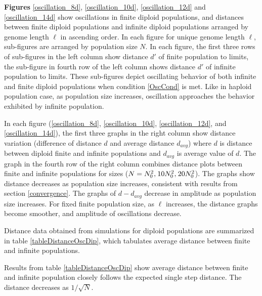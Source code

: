 \textbf{ Figures} \ref{oscillation_8d}, \ref{oscillation_10d}, \ref{oscillation_12d} 
and \ref{oscillation_14d} show oscillations in finite diploid populations, and distances 
between finite diploid populations and infinite diploid populations arranged by genome length $\ell$ in ascending order. 
In each figure for unique genome length $\ell$, sub-figures 
are arranged by population size $N$. In each figure, the first three rows of sub-figures in the left column show distance $d'$ of finite population 
to limits, the sub-figure in fourth row of the left column shows distance $d'$ of infinite population to limits. These sub-figures depict 
oscillating behavior of both infinite and finite diploid populations when condition \ref{OscCond} is met. 
Like in haploid population case, as population size increases, oscillation approaches the behavior exhibited by infinite population. 

In each figure (\ref{oscillation_8d}, \ref{oscillation_10d}, \ref{oscillation_12d}, 
and \ref{oscillation_14d}), the first three graphs in the right column show 
distance variation (difference of distance $d$ and average distance $d_{avg}$)  
where $d$ is distance between diploid finite and infinite populations and $d_{avg}$ is average value of $d$. 
The graph in the fourth row of the right column combines distance plots between finite and infinite populations for sizes 
($N = N_0^2, \hspace{0.01in}10N_0^2, \hspace{0.01in}20N_0^2$). The graphs show distance decreases 
as population size increases, consistent with results from section \ref{convergence}. 
The graphs of $d-d_{avg}$ decrease in amplitude as population size increases. 
For fixed finite population size, as $\ell$ increases, the distance graphs become smoother, and amplitude of oscillations decrease.

Distance data obtained from simulations for diploid populations are summarized in table \ref{tableDistanceOscDip}, 
which tabulates average distance between finite and infinite populations. 

Results from table \ref{tableDistanceOscDip} show average distance between finite and infinite population closely follows 
the expected single step distance. The distance decreases as $1/\sqrt{N}$.


